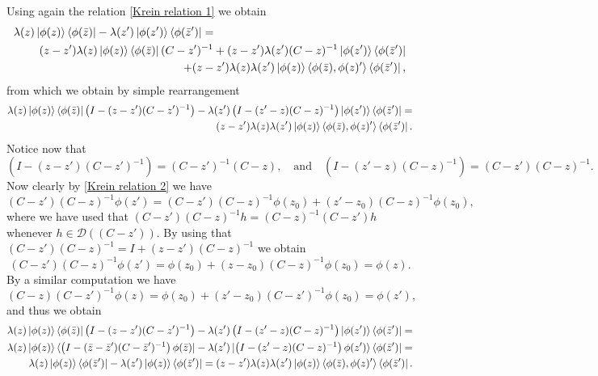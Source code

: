 \documentclass[a4paper,11pt]{article}
\newcommand{\dom}[1]{\mathscr D\left(#1\right)}
\renewcommand{\braket}[1]{\left\langle#1\right\rangle}
\numberwithin{equation}{section}
\begin{document}
Using again the relation \eqref{Krein relation 1} we obtain\begin{equation}
\begin{aligned}
\lambda(z)\ket{\phi(z)}\bra{\phi(\bar{z})}-\lambda(z')\ket{\phi(z')}\bra{\phi(\bar{z}')}=\qquad\qquad\qquad\qquad\qquad\quad\qquad\qquad\qquad\\(z-z')\lambda(z)\ket{\phi(z)}\bra{\phi(\bar{z})}(C-z')^{-1}+(z-z')\lambda(z')(C-z)^{-1}\ket{\phi(z')}\bra{\phi(\bar{z}')}\\+(z-z')\lambda(z)\lambda(z')\ket{\phi(z)}\braket{\phi(\bar{z}),\phi(z)'}\bra{\phi(\bar{z}')},
\end{aligned}
\end{equation}
from which we obtain by simple rearrangement \begin{equation}
\begin{aligned}
\lambda(z)\ket{\phi(z)}\bra{\phi(\bar{z})}\left(I-(z-z')(C-z')^{-1}\right)-\lambda(z')\left(I-(z'-z)(C-z)^{-1}\right)\ket{\phi(z')}\bra{\phi(\bar{z}')}=\\(z-z')\lambda(z)\lambda(z')\ket{\phi(z)}\braket{\phi(\bar{z}),\phi(z)'}\bra{\phi(\bar{z}')}.
\end{aligned}
\end{equation}
Notice now that \begin{equation}
\left(I-(z-z')(C-z')^{-1}\right)=(C-z')^{-1}(C-z),\quad\text{and}\quad \left(I-(z'-z)(C-z)^{-1}\right)=(C-z')(C-z)^{-1}.
\end{equation}
Now clearly by \eqref{Krein relation 2} we have \begin{equation}
(C-z')(C-z)^{-1}\phi(z')=(C-z')(C-z)^{-1}\phi(z_0)+(z'-z_0)(C-z)^{-1}\phi(z_0),
\end{equation}
where we have used that $ (C-z')(C-z)^{-1}h=(C-z)^{-1}(C-z')h $ whenever $ h\in\dom{(C-z')} $. By using that  $ (C-z')(C-z)^{-1}=I+(z-z')(C-z)^{-1} $ we obtain\begin{equation}
(C-z')(C-z)^{-1}\phi(z')=\phi(z_0)+(z-z_0)(C-z)^{-1}\phi(z_0)=\phi(z).
\end{equation}
By a similar computation we have \begin{equation}
(C-z)(C-z')^{-1}\phi(z)=\phi(z_0)+(z'-z_0)(C-z')^{-1}\phi(z_0)=\phi(z'),
\end{equation}
and thus we obtain\begin{equation}
\begin{aligned}
\lambda(z)\ket{\phi(z)}\bra{\phi(\bar{z})}\left(I-(z-z')(C-z')^{-1}\right)-\lambda(z')\left(I-(z'-z)(C-z)^{-1}\right)\ket{\phi(z')}\bra{\phi(\bar{z}')}=\\
\lambda(z)\ket{\phi(z)}\bra{\left(I-(\bar{z}-\bar{z}')(C-\bar{z}')^{-1}\right)\phi(\bar{z})}-\lambda(z')\ket{\left(I-(z'-z)(C-z)^{-1}\right)\phi(z')}\bra{\phi(\bar{z}')}=\\
\lambda(z)\ket{\phi(z)}\bra{\phi(\bar{z}')}-\lambda(z')\ket{\phi(z)}\bra{\phi(\bar{z}')}=(z-z')\lambda(z)\lambda(z')\ket{\phi(z)}\braket{\phi(\bar{z}),\phi(z)'}\bra{\phi(\bar{z}')}.
\end{aligned}
\end{equation}
\end{document}
